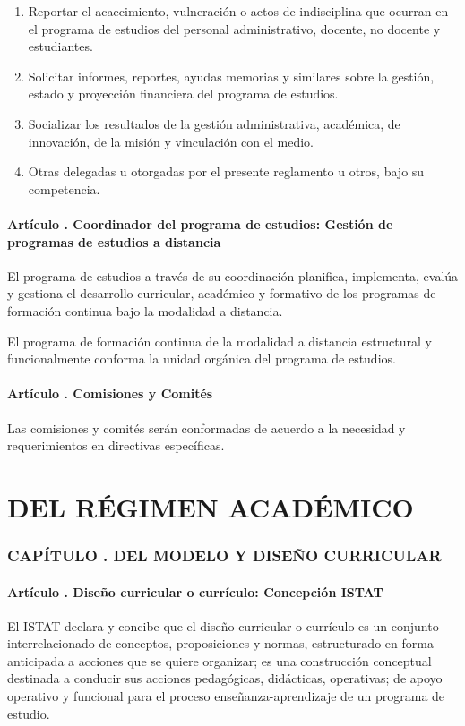 \begin{enumerate}
\item Reportar el acaecimiento, vulneración o actos de indisciplina que ocurran en el programa de estudios del personal administrativo, docente, no docente y estudiantes. 
\item Solicitar informes, reportes, ayudas memorias y similares sobre la gestión, estado y proyección financiera del programa de estudios. 
\item Socializar los resultados de la gestión administrativa, académica, de innovación, de la misión y vinculación con el medio. 
\item Otras delegadas u otorgadas por el presente reglamento u otros, bajo su competencia. 
\end{enumerate}
\subsection{Artículo . Coordinador del programa de estudios: Gestión de programas de estudios a distancia}
\addtocounter{ns}{1}
El programa de estudios a través de su coordinación planifica, implementa, evalúa y gestiona el desarrollo curricular, académico y formativo de los programas de formación continua bajo la modalidad a distancia. 

El programa de formación continua de la modalidad a distancia estructural y funcionalmente conforma la unidad orgánica del programa de estudios. 
\subsection{Artículo . Comisiones y Comités}
\addtocounter{ns}{1}
Las comisiones y comités serán conformadas de acuerdo a la necesidad y requerimientos en directivas específicas.

\part{DEL RÉGIMEN ACADÉMICO}
\section{CAPÍTULO . DEL MODELO Y DISEÑO CURRICULAR}
\addtocounter{re}{1}

\subsection{Artículo . Diseño curricular o currículo: Concepción ISTAT}
\addtocounter{ns}{1}
El ISTAT declara y concibe que el diseño curricular o currículo es un conjunto interrelacionado de conceptos, proposiciones y normas, estructurado en forma anticipada a acciones que se quiere organizar; es una construcción conceptual destinada a conducir sus acciones pedagógicas, didácticas, operativas; de apoyo operativo y funcional para el proceso enseñanza-aprendizaje de un programa de estudio. 
